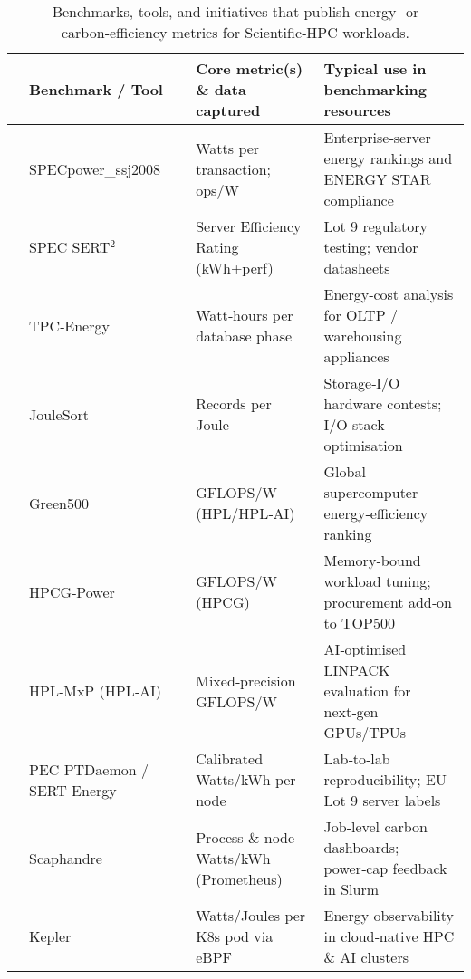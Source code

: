 \begin{table*}[!t]
  \centering
  \caption{Benchmarks, tools, and initiatives that publish energy‑ or carbon‑efficiency metrics for Scientific‑HPC workloads. }
  \label{tab:hpc_energy_catalog}
  
  
  
  \begin{tabularx}{0.9\textwidth}{|p{}p{}p{}XX|}
    \toprule
    &
     \headerfont\textbf{Benchmark / Tool} & 
     &
     \headerfont\textbf{Core metric(s) \& data captured} & \headerfont\textbf{Typical use in benchmarking resources} \\ 
    \midrule
    \hline
   & SPECpower\_ssj2008 & \cite{specpower}            & Watts per transaction; ops/W & Enterprise‑server energy rankings and ENERGY STAR compliance \\  
   & SPEC SERT$^{2}$  & \cite{sert2}                   & Server Efficiency Rating (kWh+perf)& Lot 9 regulatory testing; vendor datasheets \\  
   & TPC‑Energy  & \cite{tpcenergy}                    & Watt‑hours per database phase & Energy‑cost analysis for OLTP / warehousing appliances \\  
   & JouleSort  & \cite{joulesort}                     & Records per Joule & Storage‑I/O hardware contests; I/O stack optimisation \\  
   & Green500  & \cite{green500}                       & GFLOPS/W (HPL/HPL‑AI) & Global supercomputer energy‑efficiency ranking \\  
   & HPCG‑Power  & \cite{hpcgpower}                    & GFLOPS/W (HPCG) & Memory‑bound workload tuning; procurement add‑on to TOP500 \\  
   & HPL‑MxP (HPL‑AI)  & \cite{hplmxphplai}            & Mixed‑precision GFLOPS/W & AI‑optimised LINPACK evaluation for next‑gen GPUs/TPUs \\  
   & PEC PTDaemon / SERT Energy  & \cite{specptdaemonser} & Calibrated Watts/kWh per node & Lab‑to‑lab reproducibility; EU Lot 9 server labels \\  
   & Scaphandre  & \cite{scaphandre}                    & Process \& node Watts/kWh (Prometheus) & Job‑level carbon dashboards; power‑cap feedback in Slurm \\  
   & Kepler  & \cite{kepler}                            & Watts/Joules per K8s pod via eBPF & Energy observability in cloud‑native HPC \& AI clusters \\  

\end{tabularx}
\end{table*}
